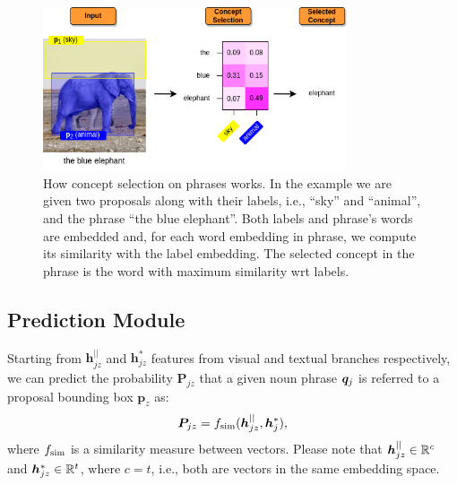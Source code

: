 \begin{figure}
  \centering
  \includegraphics[width=0.8\textwidth]{figures/concept-selection-example.png}
  \caption[How concept selection on phrases works]{How concept
  selection on phrases works. In the example we are given two
  proposals along with their labels, i.e., ``sky'' and ``animal'', and
  the phrase ``the blue elephant''. Both labels and phrase's words are
  embedded and, for each word embedding in phrase, we compute its
  similarity with the label embedding. The selected concept in the
  phrase is the word with maximum similarity wrt labels. }
  \label{fig:concept-selection-example}
\end{figure}

\subsection{Prediction Module}
\label{subsec:prediction-module}

Starting from $\bm{h}^{||}_{jz}$ and $\bm{h}^*_{jz}$ features from
visual and textual branches respectively, we can predict the
probability $\bm{P}_{jz}$ that a given noun phrase $\bm{q}_j$ is referred
to a proposal bounding box $\bm{p}_z$ as:
\begin{equation}
  \bm{P}_{jz} = f_{\text{sim}} ( \bm{h}^{||}_{jz} , \bm{h}^*_j ),
\end{equation}
where $f_{\text{sim}}$ is a similarity measure between vectors. Please note
that $\bm{h}^{||}_{jz} \in \mathbb{R}^c$ and $\bm{h}^*_{jz} \in \mathbb{R}^t$,
where $c = t$, i.e., both are vectors in the same embedding space.

